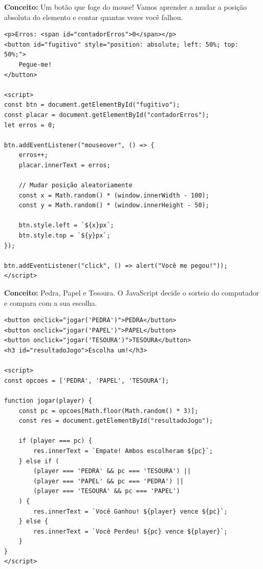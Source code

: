 \documentclass[12pt,a4paper]{article}
\begin{document}
\begin{boxAtividade}
\textbf{Conceito:} Um botão que foge do mouse! Vamos aprender a mudar a posição absoluta do elemento e contar quantas vezes você falhou.

\begin{boxCodigo}
\begin{verbatim}
<p>Erros: <span id="contadorErros">0</span></p>
<button id="fugitivo" style="position: absolute; left: 50%; top: 50%;">
    Pegue-me!
</button>

<script>
const btn = document.getElementById("fugitivo");
const placar = document.getElementById("contadorErros");
let erros = 0;

btn.addEventListener("mouseover", () => {
    erros++;
    placar.innerText = erros;
    
    // Mudar posição aleatoriamente
    const x = Math.random() * (window.innerWidth - 100);
    const y = Math.random() * (window.innerHeight - 50);
    
    btn.style.left = `${x}px`;
    btn.style.top = `${y}px`;
});

btn.addEventListener("click", () => alert("Você me pegou!"));
</script>
\end{verbatim}
\end{boxCodigo}
\end{boxAtividade}

\begin{boxAtividade}
\textbf{Conceito:} Pedra, Papel e Tesoura. O JavaScript decide o sorteio do computador e compara com a sua escolha.

\begin{boxCodigo}
\begin{verbatim}
<button onclick="jogar('PEDRA')">PEDRA</button>
<button onclick="jogar('PAPEL')">PAPEL</button>
<button onclick="jogar('TESOURA')">TESOURA</button>
<h3 id="resultadoJogo">Escolha um!</h3>

<script>
const opcoes = ['PEDRA', 'PAPEL', 'TESOURA'];

function jogar(player) {
    const pc = opcoes[Math.floor(Math.random() * 3)];
    const res = document.getElementById("resultadoJogo");
    
    if (player === pc) {
        res.innerText = `Empate! Ambos escolheram ${pc}`;
    } else if (
        (player === 'PEDRA' && pc === 'TESOURA') ||
        (player === 'PAPEL' && pc === 'PEDRA') ||
        (player === 'TESOURA' && pc === 'PAPEL')
    ) {
        res.innerText = `Você Ganhou! ${player} vence ${pc}`;
    } else {
        res.innerText = `Você Perdeu! ${pc} vence ${player}`;
    }
}
</script>
\end{verbatim}
\end{boxCodigo}
\end{boxAtividade}
\end{document}
